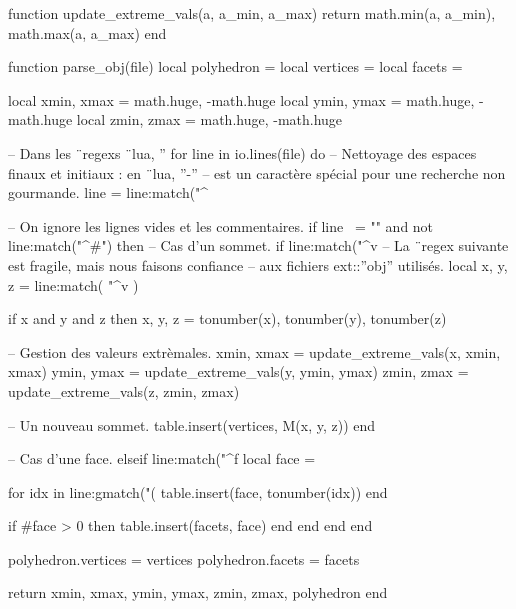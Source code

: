 \documentclass{standalone}
\begin{document}
\begin{luacode}
function update_extreme_vals(a, a_min, a_max)
  return math.min(a, a_min), math.max(a, a_max)
end

function parse_obj(file)
  local polyhedron = {}
  local vertices  = {}
  local facets    = {}

  local xmin, xmax = math.huge, -math.huge
  local ymin, ymax = math.huge, -math.huge
  local zmin, zmax = math.huge, -math.huge

-- Dans les ¨regexs ¨lua, ''%
  for line in io.lines(file) do
-- Nettoyage des espaces finaux et initiaux : en ¨lua, ''-''
-- est un caractère spécial pour une recherche non gourmande.
    line = line:match("^%

-- On ignore les lignes vides et les commentaires.
    if line ~= "" and not line:match("^#") then
-- Cas d'un sommet.
      if line:match("^v%
-- La ¨regex suivante est fragile, mais nous faisons confiance
-- aux fichiers ext::''obj'' utilisés.
        local x, y, z = line:match(
          "^v%
        )

        if x and y and z then
          x, y, z = tonumber(x), tonumber(y), tonumber(z)

-- Gestion des valeurs extrèmales.
          xmin, xmax = update_extreme_vals(x, xmin, xmax)
          ymin, ymax = update_extreme_vals(y, ymin, ymax)
          zmin, zmax = update_extreme_vals(z, zmin, zmax)

-- Un nouveau sommet.
          table.insert(vertices, M(x, y, z))
        end

-- Cas d'une face.
      elseif line:match("^f%
        local face = {}

        for idx in line:gmatch("(%
          table.insert(face, tonumber(idx))
        end

        if #face > 0 then
          table.insert(facets, face)
        end
      end
    end
  end

  polyhedron.vertices = vertices
  polyhedron.facets   = facets

  return {xmin, xmax, ymin, ymax, zmin, zmax}, polyhedron
end
\end{luacode}
\end{document}
